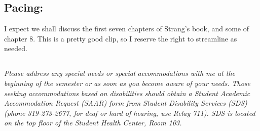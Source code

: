 \documentclass[10pt]{article}
\begin{document}
\subsection*{Pacing:}
	I expect we shall discuss the first seven chapters of Strang’s book, and some of chapter 8. This is a pretty good clip, so I reserve the right to streamline as needed.

\subsection*{}
\emph{Please address any special needs or special accommodations with me at the beginning of the semester or as soon as you become aware of your needs. Those seeking accommodations based on disabilities should obtain a Student Academic Accommodation Request (SAAR) form from Student Disability Services (SDS) (phone 319-273-2677, for deaf or hard of hearing, use Relay 711). SDS is located on the top floor of the Student Health Center, Room 103.}
\end{document}
